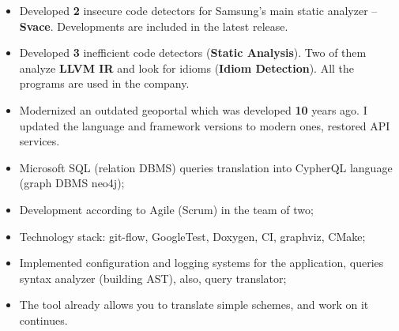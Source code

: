 \documentclass[10pt,a4paper,ragged2e,withhyper]{custom-altacv}
\begin{document}
\begin{paracol}{2}


\begin{itemize}
	\item Developed \textbf{2} insecure code detectors for Samsung's main static analyzer -- \textbf{Svace}. Developments are included in the latest release.
\end{itemize}

\divider


\begin{itemize}
	\item Developed \textbf{3} inefficient code detectors (\textbf{Static Analysis}). Two of them analyze \textbf{LLVM IR} and look for idioms (\textbf{Idiom Detection}). All the programs are used in the company.
\end{itemize}

\divider


\begin{itemize}
	\item Modernized an outdated geoportal which was developed \textbf{10} years ago. I updated the language and framework versions to modern ones, restored API services.
\end{itemize}


\medskip




\begin{itemize}
	\item Microsoft SQL (relation DBMS) queries translation into CypherQL language (graph DBMS neo4j);
	\item Development according to Agile (Scrum) in the team of two;
	\item Technology stack: git-flow, GoogleTest, Doxygen, CI, graphviz, CMake;
	\item Implemented configuration and logging systems for the application, queries syntax analyzer (building AST), also, query translator;
	\item The tool already allows you to translate simple schemes, and work on it continues.
\end{itemize}


\end{paracol}
\end{document}

